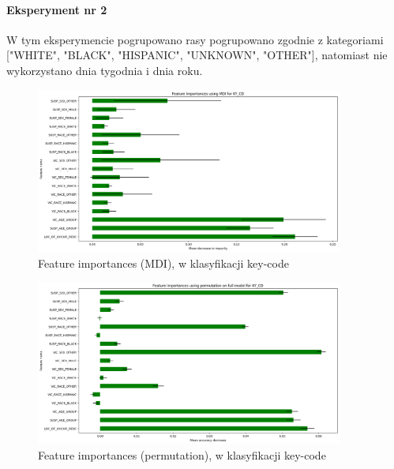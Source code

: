 \documentclass{classrep}
\begin{document}
{{{                \paragraph{Eksperyment nr 2}{
                    W tym eksperymencie pogrupowano rasy pogrupowano zgodnie z kategoriami ["WHITE", "BLACK", "HISPANIC", "UNKNOWN", "OTHER"], natomiast nie wykorzystano dnia tygodnia i dnia roku.
                    \begin{figure}[!htbp]
                        \centering
                        \includegraphics[width=0.9\textwidth]{img/5.1.3/2/Feature importances using MDI for KY_CD.png}
                        \caption{Feature importances (MDI), w klasyfikacji key-code}
                        \label{goal_1_exp_2_imp_mdi_key}
                    \end{figure}
                    
                    \begin{figure}[!htbp]
                        \centering
                        \includegraphics[width=0.9\textwidth]{img/5.1.3/2/Feature importances using permutation on full model for KY_CD.png}
                        \caption{Feature importances (permutation), w klasyfikacji key-code}
                        \label{goal_1_exp_2_imp_perm_key}
                    \end{figure}
                    
}}}}
\end{document}
